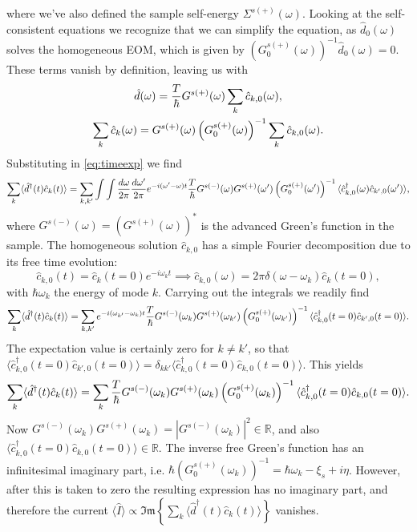 where we've also defined the sample self-energy $\Sigma^{s(+)}(\omega)$. Looking at the self-consistent equations we recognize that we can simplify the equation, as $\hat{d}_0(\omega)$ solves the homogeneous EOM, which is given by $(G^{s(+)}_0(\omega))^{-1}\hat{d}_0(\omega) = 0$. These terms vanish by definition, leaving us with
\begin{gather}
    \hat{d}(\omega) = \frac{T}{\hbar} G^{s(+)}(\omega)\sum_k\hat{c}_{k,0}(\omega),\\
    \sum_k\hat{c}_k(\omega) = G^{s(+)}(\omega)\left(G^{s(+)}_0(\omega)\right)^{-1}\sum_k\hat{c}_{k,0}(\omega).
\end{gather}
Substituting in \autoref{eq:timeexp} we find
\begin{equation}
    \sum_k \langle{\hat{d}^\dagger(t)\hat{c}_k(t)}\rangle = \sum_{k,k'}\int\int\frac{d\omega}{2\pi}\frac{d\omega'}{2\pi}e^{-i(\omega'-\omega)t} \frac{T}{\hbar} G^{s(-)}(\omega)G^{s(+)}(\omega')\left(G^{s(+)}_0(\omega')\right)^{-1}\langle\hat{c}^\dagger_{k,0}(\omega)\hat{c}_{k',0}(\omega')\rangle,
\end{equation}
where $G^{s(-)}(\omega) = \left(G^{s(+)}(\omega)\right)^*$ is the advanced Green's function in the sample. The homogeneous solution $\hat{c}_{k,0}$ has a simple Fourier decomposition due to its free time evolution:
\begin{equation}
    \hat{c}_{k,0}(t) = \hat{c}_k(t=0)e^{-i\omega_k t} \implies \hat{c}_{k,0}(\omega) = 2\pi\delta(\omega-\omega_k)\hat{c}_k(t=0),
\end{equation}
with $\hbar\omega_k$ the energy of mode $k$. Carrying out the integrals we readily find
\begin{equation}
    \sum_k \langle{\hat{d}^\dagger(t)\hat{c}_k(t)}\rangle = \sum_{k,k'}e^{-i(\omega_{k'}-\omega_k)t} \frac{T}{\hbar} G^{s(-)}(\omega_k)G^{s(+)}(\omega_{k'})\left(G^{s(+)}_0(\omega_{k'})\right)^{-1}\langle\hat{c}^\dagger_{k,0}(t=0)\hat{c}_{k',0}(t=0)\rangle.
\end{equation}
The expectation value is certainly zero for $k\neq k'$, so that $\langle\hat{c}^\dagger_{k,0}(t=0)\hat{c}_{k',0}(t=0)\rangle = \delta_{kk'}\langle\hat{c}^\dagger_{k,0}(t=0)\hat{c}_{k,0}(t=0)\rangle$. This yields
\begin{equation}
    \sum_k \langle{\hat{d}^\dagger(t)\hat{c}_k(t)}\rangle = \sum_k\frac{T}{\hbar} G^{s(-)}(\omega_k)G^{s(+)}(\omega_{k})\left(G^{s(+)}_0(\omega_{k})\right)^{-1}\langle\hat{c}^\dagger_{k,0}(t=0)\hat{c}_{k,0}(t=0)\rangle.
\end{equation}
Now $G^{s(-)}(\omega_k)G^{s(+)}(\omega_{k}) = |G^{s(-)}(\omega_k)|^2 \in \mathbb{R}$, and also $\langle\hat{c}^\dagger_{k,0}(t=0)\hat{c}_{k,0}(t=0)\rangle \in \mathbb{R}$. The inverse free Green's function has an infinitesimal imaginary part, i.e. $\hbar\left(G^{s(+)}_0(\omega_{k})\right)^{-1} = \hbar\omega_k - \xi_s + i\eta$. However, after this is taken to zero the resulting expression has no imaginary part, and therefore the current $\langle \hat{I} \rangle \propto \mathfrak{Im}\left\{\sum_k \langle{\hat{d}^\dagger(t)\hat{c}_k(t)}\rangle\right\}$ vanishes.

